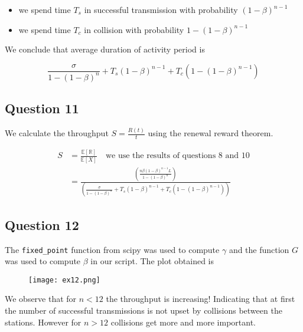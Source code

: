 \documentclass[]{article}
\begin{document}
	\begin{itemize}
		\item we spend time $T_s$ in successful transmission with probability $(1-\beta)^{n-1}$
		\item we spend time $T_c$ in collision with probability $1 - (1-\beta)^{n-1}$
	\end{itemize}
	
	We conclude that average duration of activity period is
	
	\begin{equation}
		\frac{\sigma}{1 - (1-\beta)^n} + T_s(1-\beta)^{n-1} + T_c\left(1 - (1-\beta)^{n-1}\right)
	\end{equation}
	
	\subsection*{Question 11}
	
	We calculate the throughput $S = \frac{R(t)}{t}$ using the renewal reward theorem.
	
	\begin{align}
		S &= \frac{\mathbb{E[R]}}{\mathbb{E}[X]} \quad \text{we use the results of questions 8 and 10} \\
		&= \frac{\left(\frac{n\beta(1-\beta)^{n-1}L}{1 - (1-\beta)^n}\right)}{\left(\frac{\sigma}{1 - (1-\beta)^n} + T_s(1-\beta)^{n-1} + T_c\left(1 - (1-\beta)^{n-1}\right)\right)}
	\end{align}
	
	\subsection*{Question 12}
	
	The \texttt{fixed\_point} function from scipy was used to compute $\gamma$ and the function $G$ was used to compute $\beta$ in our script. The plot obtained is
	
	\begin{figure}[h]
		\centering
		\texttt{[image: ex12.png]}
	\end{figure}
	
	We observe that for $n < 12$ the throughput is increasing! Indicating that at first the number of successful transmissions is not upset by collisions between the stations. However for $n > 12$ collisions get more and more important.
	
\end{document}
